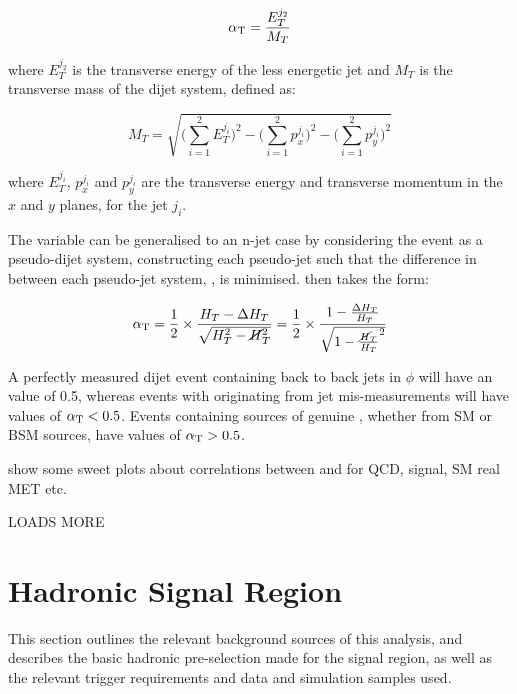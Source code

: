 \begin{equation}
\alpha_{\text{T}} = \frac{E_T^{j_2}}{M_T}
\label{eq:alphat_dijet}
\end{equation}

where $E_T^{j_2}$ is the transverse energy of the less energetic jet and $M_T$ 
is the transverse mass of the dijet system, defined as:

\begin{equation}
M_T = \sqrt{\bigg(\sum^2_{i=1}{E_T^{j_i}}\bigg)^2 - \bigg(\sum^2_{i=1}{p_x^{j_i}}\bigg)^2 - \bigg(\sum^2_{i=1}{p_y^{j_i}}\bigg)^2}
\label{eq:mt}
\end{equation}

where $E_T^{j_i}$, $p_x^{j_i}$ and $p_y^{j_i}$ are the transverse energy and 
transverse momentum in the $x$ and $y$ planes, for the jet $j_i$.

The \alphat variable can be generalised to an n-jet case by considering the event as a 
pseudo-dijet system, constructing each pseudo-jet such that the difference in \HT
between each pseudo-jet system, \deltaHT, is minimised. \alphat then takes the 
form:

\begin{equation}
\alpha_{\text{T}} = \frac{1}{2} \times \frac{H_T-\Delta H_T}{\sqrt{H_T^2 - \cancel{H}_T^2}} = 
\frac{1}{2} \times \frac{1-\frac{\Delta H_T}{H_T}}{\sqrt{1 - \frac{\cancel{H}_T}{H_T}^2}}
\label{eq:alphat_njet}
\end{equation}

A perfectly measured dijet event containing back to back jets in $\phi$ will have an
\alphat value of 0.5, whereas 
events with \mht originating from jet mis-measurements will have values of $\alpha_{\text{T}}<0.5$.
Events
containing sources of genuine \met, whether from SM or BSM 
sources, have values of $\alpha_{\text{T}} > 0.5$.

show some sweet plots about correlations between \mht and \deltaHT for QCD, 
signal, SM real MET etc.

LOADS MORE


\section{Hadronic Signal Region}
\label{sec:selection_hadronic}

This section outlines the relevant background sources of this analysis, and
describes the basic hadronic pre-selection made for the signal 
region, as well as the relevant trigger requirements and data and 
simulation samples used.

